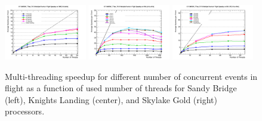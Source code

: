 \documentclass{webofc}
\def\threep{0.32\textwidth}
\def\postfigskip{\vskip-4mm}
\begin{document}
\begin{figure}[htb]
  \centering
  \includegraphics[width=\threep]{figs/comp/SNB_CMSSW_TTbar_PU70_CE_MEIF_speedup.png}
  \hfill
  \includegraphics[width=\threep]{figs/comp/KNL_CMSSW_TTbar_PU70_CE_MEIF_speedup.png}
  \hfill
  \includegraphics[width=\threep]{figs/comp/SKL-SP_CMSSW_TTbar_PU70_CE_MEIF_speedup.png}
  \postfigskip

  \caption{Multi-threading speedup for different number of concurrent events
    in flight as a function of used number of threads for Sandy Bridge (left),
    Knights Landing (center), and Skylake Gold (right) processors.}
  \label{fig:meif-speedup}
\end{figure}
\end{document}
